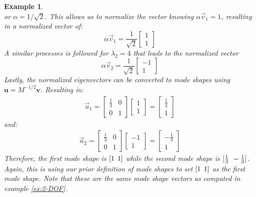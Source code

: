 \documentclass[12pt,letter]{article}
\newtheorem{ex}{Example}
\numberwithin{ex}{section} %
\newenvironment{example}{\begin{mdframed}[middlelinewidth=0.5mm]\begin{ex}\normalfont}{\end{ex}\end{mdframed}}
\numberwithin{re}{section} %
\begin{document}
\begin{example}
\begin{equation}
\end{equation}
or $\alpha = 1/\sqrt{2}$. This allows us to normalize the vector knowing $\alpha \vec{v}_1=1$, resulting in a normalized vector of:
\begin{equation}
\alpha \vec{v}_1=  \frac{1}{\sqrt{2}} \begin{bmatrix} 1 \\ 1 \end{bmatrix} 
\end{equation} 
A similar processes is followed for $\lambda_2=4$ that leads to the normalized vector 
\begin{equation}
\alpha \vec{v}_2=  \frac{1}{\sqrt{2}} \begin{bmatrix} -1 \\ 1 \end{bmatrix} 
\end{equation} 
Lastly, the normalized eigenvectors can be converted to mode shapes using $\textbf{u} = M^{-1/2}\textbf{v}$. Resulting in: 
\begin{eqnarray}
\vec{u}_1 =  \begin{bmatrix} \frac{1}{3} & 0  \\  0 & 1 \end{bmatrix}   \begin{bmatrix} 1 \\  1 \end{bmatrix} =  \begin{bmatrix} \frac{1}{3} \\  1 \end{bmatrix}
\end{eqnarray}
and:
\begin{eqnarray}
\vec{u}_2 =  \begin{bmatrix} \frac{1}{3} & 0  \\  0 & 1 \end{bmatrix}   \begin{bmatrix} -1 \\  1 \end{bmatrix} =  \begin{bmatrix} -\frac{1}{3} \\  1 \end{bmatrix}
\end{eqnarray}
Therefore, the first mode shape is $[1 \hspace{1ex} 1]$ while the second mode shape is $[\frac{1}{3} \hspace{1ex} -\frac{1}{3}]$. Again, this is using our prior definition of mode shapes to set $[1 \hspace{1ex} 1]$ as the first mode shape. Note that these are the same mode shape vectors as computed in example \ref{ex:2-DOF}.
\end{example}
\end{document}
